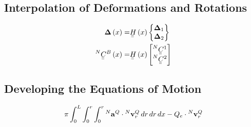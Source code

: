 \documentclass[a4paper]{article}
\newcommand{\ubar}[1]{\underaccent{\bar}{#1}}
\begin{document}
\subsection*{Interpolation of Deformations and Rotations}
\begin{align}
  \mathbf{\Delta} \left( x \right)  =& \ubar{\ubar{H}}\left( x \right) \begin{Bmatrix} \mathbf{\Delta}_{1}\\ \mathbf{\Delta}_{2} \end{Bmatrix} \\
  \prescript{N}{}{\ubar{\ubar{C}}}^{B} \left( x \right)  =& \ubar{\ubar{H}}\left( x \right) \begin{bmatrix} \prescript{N}{}{\ubar{\ubar{C}}}^{1}\\ \prescript{N}{}{\ubar{\ubar{C}}}^{2} \end{bmatrix}
  \label{}
\end{align}

\subsection*{Developing the Equations of Motion}
\begin{align}
  \pi\int_{0}^{L}\int_{0}^{r}\int_{0}^{r}\prescript{N}{}{\mathbf{a}}^{Q} \cdot \prescript{N}{}{\mathbf{v}}^{Q}_{r} \,dr\,dr\,dx- Q_{e} \cdot \prescript{N}{}{\mathbf{v}}^{Q}_{r}
\end{align}
\end{document}
